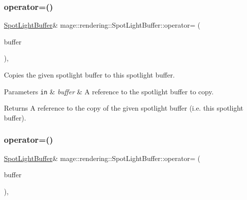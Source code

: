 \subsubsection{\texorpdfstring{operator=()}{operator=()}\hspace{0.1cm}{\footnotesize\ttfamily [1/2]}}
{\footnotesize\ttfamily \hyperlink{structmage_1_1rendering_1_1_spot_light_buffer}{Spot\+Light\+Buffer}\& mage\+::rendering\+::\+Spot\+Light\+Buffer\+::operator= (\begin{DoxyParamCaption}\item[{const \hyperlink{structmage_1_1rendering_1_1_spot_light_buffer}{Spot\+Light\+Buffer} \&}]{buffer }\end{DoxyParamCaption})\hspace{0.3cm}{\ttfamily [default]}, {\ttfamily [noexcept]}}

Copies the given spotlight buffer to this spotlight buffer.


\begin{DoxyParams}[1]{Parameters}
\mbox{\tt in}  & {\em buffer} & A reference to the spotlight buffer to copy. \\
\hline
\end{DoxyParams}
\begin{DoxyReturn}{Returns}
A reference to the copy of the given spotlight buffer (i.\+e. this spotlight buffer). 
\end{DoxyReturn}
\hypertarget{structmage_1_1rendering_1_1_spot_light_buffer_ab3d50a0d08d284577b0e43b05c34e287}{}\label{structmage_1_1rendering_1_1_spot_light_buffer_ab3d50a0d08d284577b0e43b05c34e287} 
\subsubsection{\texorpdfstring{operator=()}{operator=()}\hspace{0.1cm}{\footnotesize\ttfamily [2/2]}}
{\footnotesize\ttfamily \hyperlink{structmage_1_1rendering_1_1_spot_light_buffer}{Spot\+Light\+Buffer}\& mage\+::rendering\+::\+Spot\+Light\+Buffer\+::operator= (\begin{DoxyParamCaption}\item[{\hyperlink{structmage_1_1rendering_1_1_spot_light_buffer}{Spot\+Light\+Buffer} \&\&}]{buffer }\end{DoxyParamCaption})\hspace{0.3cm}{\ttfamily [default]}, {\ttfamily [noexcept]}}

